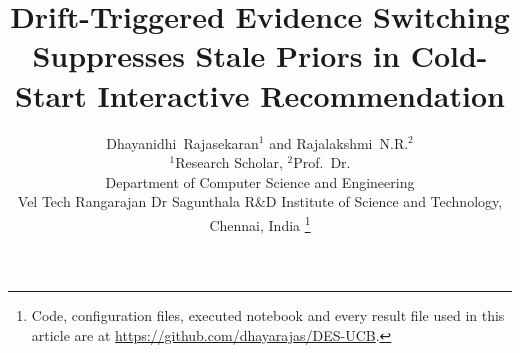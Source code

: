 \documentclass[journal]{IEEEtran}
\begin{document}
\title{Drift-Triggered Evidence Switching Suppresses Stale Priors in Cold-Start Interactive Recommendation}
\author{Dhayanidhi~Rajasekaran$^{1}$ and Rajalakshmi~N.R.$^{2}$\\[2pt]
{\normalsize $^{1}$Research Scholar, $^{2}$Prof.\ Dr.}\\
{\normalsize Department of Computer Science and Engineering}\\
{\normalsize Vel Tech Rangarajan Dr Sagunthala R\&D Institute of Science and Technology, Chennai, India}%
\thanks{Code, configuration files, executed notebook and every result file used in this article are at \url{https://github.com/dhayarajas/DES-UCB}.}%
}
\maketitle

\end{document}

